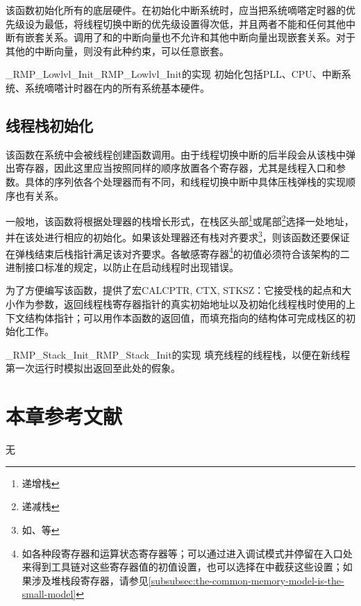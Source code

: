 该函数初始化所有的底层硬件。在初始化中断系统时，应当把系统嘀嗒定时器的优先级设为最低，将线程切换中断的优先级设置得次低，并且两者不能和任何其他中断有嵌套关系。调用了和的中断向量也不允许和其他中断向量出现嵌套关系。对于其他的中断向量，则没有此种约束，可以任意嵌套。

\begin{apidesc}{\_RMP\_Lowlvl\_Init}{\_RMP\_Lowlvl\_Init的实现}
    初始化包括PLL、CPU、中断系统、系统嘀嗒计时器在内的所有系统基本硬件。
    \begin{apiparams}
    \end{apiparams}
    \begin{apiret}
    \end{apiret}
\end{apidesc}

\subsection{线程栈初始化}\label{subsec:thread-stack-initialisation}

该函数在系统中会被线程创建函数调用。由于线程切换中断的后半段会从该栈中弹出寄存器，因此这里应当按照同样的顺序放置各个寄存器，尤其是线程入口和参数。具体的序列依各个处理器而有不同，和线程切换中断中具体压栈弹栈的实现顺序也有关系。

一般地，该函数将根据处理器的栈增长形式，在栈区头部\footnote{递增栈}或尾部\footnote{递减栈}选择一处地址，并在该处进行相应的初始化。如果该处理器还有栈对齐要求\footnote{如、等}，则该函数还要保证在弹栈结束后栈指针满足该对齐要求。各敏感寄存器\footnote{如各种段寄存器和运算状态寄存器等；可以通过进入调试模式并停留在入口处来得到工具链对这些寄存器值的初值设置，也可以选择在中截获这些设置；如果涉及堆栈段寄存器，请参见\ref{subsubsec:the-common-memory-model-is-the-small-model}}的初值必须符合该架构的二进制接口标准的规定，以防止在启动线程时出现错误。

为了方便编写该函数，提供了宏CALCPTR, CTX,
STKSZ：它接受栈的起点和大小作为参数，返回线程栈寄存器指针的真实初始地址以及初始化线程栈时使用的上下文结构体指针；可以用作本函数的返回值，而填充指向的结构体可完成栈区的初始化工作。

\begin{apidesc}{\_RMP\_Stack\_Init}{\_RMP\_Stack\_Init的实现}
    填充线程的线程栈，以便在新线程第一次运行时模拟出返回至此处的假象。
    \begin{apiparams}
    \end{apiparams}
    \begin{apiret}
    \end{apiret}
\end{apidesc}

\section{本章参考文献}\label{sec:chapter-bibliography-9}

无
